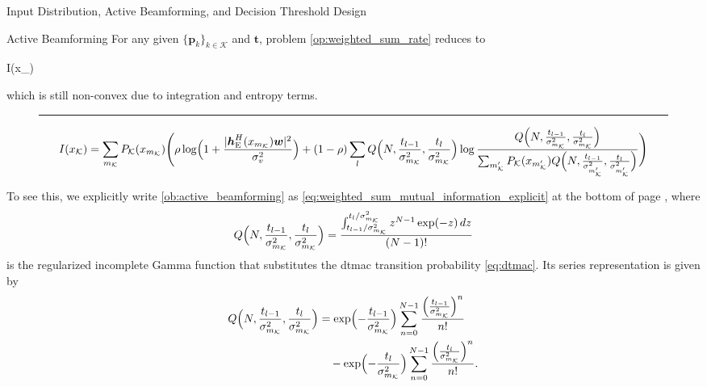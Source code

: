 \documentclass[journal]{IEEEtran}
\begin{document}
\begin{section}{Input Distribution, Active Beamforming, and Decision Threshold Design}
	\begin{subsection}{Active Beamforming}
		For any given $\{\boldsymbol{p}_k\}_{k \in \mathcal{K}}$ and $\boldsymbol{t}$, problem \eqref{op:weighted_sum_rate} reduces to
		\begin{maxi!}
			{}{I(x_{})}{\label{op:active_beamforming}}{\label{ob:active_beamforming}}
			\addConstraint{\eqref{co:transmit_power},}
		\end{maxi!}
		which is still non-convex due to integration and entropy terms.
		\begin{figure*}[!b]
			\hrule
			\begin{equation}
				I(x_{\mathcal{K}})=\sum_{m_{\mathcal{K}}}P_{\mathcal{K}}(x_{m_{\mathcal{K}}})\Biggl(\rho\log\Bigl(1+\frac{\lvert\boldsymbol{h}_{\mathrm{E}}^H(x_{m_{\mathcal{K}}})\boldsymbol{w}\rvert^2}{\sigma_v^2}\Bigr)+(1-\rho)\sum_l Q\Bigl(N,\frac{t_{l-1}}{\sigma_{m_{\mathcal{K}}}^2},\frac{t_l}{\sigma_{m_{\mathcal{K}}}^2}\Bigr) \log \frac{Q\Bigl(N,\frac{t_{l-1}}{\sigma_{m_{\mathcal{K}}}^2},\frac{t_l}{\sigma_{m_{\mathcal{K}}}^2}\Bigr)}{\sum_{m_{\mathcal{K}}'} P_{\mathcal{K}}(x_{m_{\mathcal{K}}'}) Q\Bigl(N,\frac{t_{l-1}}{\sigma_{m_{\mathcal{K}}'}^2},\frac{t_l}{\sigma_{m_{\mathcal{K}}'}^2}\Bigr)}\Biggr)
				\label{eq:weighted_sum_mutual_information_explicit}
			\end{equation}
		\end{figure*}
		To see this, we explicitly write \eqref{ob:active_beamforming} as \eqref{eq:weighted_sum_mutual_information_explicit} at the bottom of page \pageref{eq:regularized_incomplete_gamma}, where
		\begin{equation}
			Q\Bigl(N,\frac{t_{l-1}}{\sigma_{m_{\mathcal{K}}}^2},\frac{t_l}{\sigma_{m_{\mathcal{K}}}^2}\Bigr) = \frac{\int_{{t_{l-1}}/{\sigma_{m_{\mathcal{K}}}^2}}^{{t_l}/{\sigma_{m_{\mathcal{K}}}^2}} z^{N-1} \exp(-z) \, d z}{(N-1)!}
			\label{eq:regularized_incomplete_gamma}
		\end{equation}
		is the regularized incomplete Gamma function that substitutes the \gls{dtmac} transition probability \eqref{eq:dtmac}.
		Its series representation is given by \cite[Theorem~3]{Jameson2016}
		\begin{align}
			Q\Bigl(N,\frac{t_{l-1}}{\sigma_{m_{\mathcal{K}}}^2},\frac{t_l}{\sigma_{m_{\mathcal{K}}}^2}\Bigr)
			 & = \exp \Bigl(-\frac{t_{l-1}}{\sigma_{m_{\mathcal{K}}}^2}\Bigr) \sum_{n=0}^{N-1} \frac{\Bigl(\frac{t_{l-1}}{\sigma_{m_{\mathcal{K}}}^2}\Bigr)^n}{n!} \nonumber \\
			 & \quad - \exp \Bigl(-\frac{t_l}{\sigma_{m_{\mathcal{K}}}^2}\Bigr) \sum_{n=0}^{N-1} \frac{\Bigl(\frac{t_l}{\sigma_{m_{\mathcal{K}}}^2}\Bigr)^n}{n!}.

\end{align}
\end{subsection}
\end{section}
\end{document}
